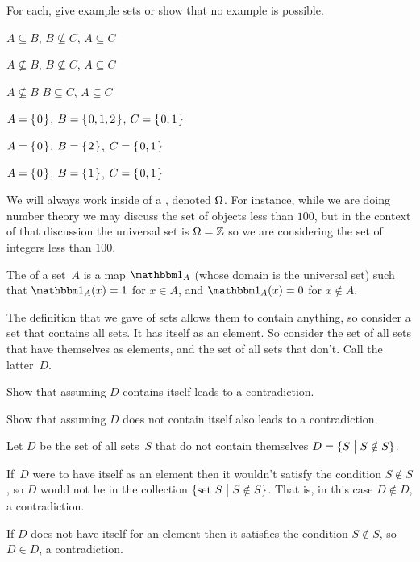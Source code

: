 \documentclass{ibl}  %
\begin{document}
\begin{ex} For each, give example sets or show that no example is possible.
\begin{items}
\item $A\subseteq B$, $B\not\subseteq C$, $A\subseteq C$
\item $A\not\subseteq B$, $B\not\subseteq C$, $A\subseteq C$
\item $A\not\subseteq B$ $B\subseteq C$, $A\subseteq C$    
\end{items}
\begin{ans}
\begin{items}
\item $A=\mbox{$\{\hspace{0.1em}0\hspace{0.1em}\}$}$, $B=\mbox{$\{\hspace{0.1em}0,1,2\hspace{0.1em}\}$}$, $C=\mbox{$\{\hspace{0.1em}0,1\hspace{0.1em}\}$}$
\item $A=\mbox{$\{\hspace{0.1em}0\hspace{0.1em}\}$}$, $B=\mbox{$\{\hspace{0.1em}2\hspace{0.1em}\}$}$, $C=\mbox{$\{\hspace{0.1em}0,1\hspace{0.1em}\}$}$
\item $A=\mbox{$\{\hspace{0.1em}0\hspace{0.1em}\}$}$, $B=\mbox{$\{\hspace{0.1em}1\hspace{0.1em}\}$}$, $C=\mbox{$\{\hspace{0.1em}0,1\hspace{0.1em}\}$}$
\end{items}
\end{ans}
\end{ex}

We will always work inside of a , 
denoted $\Omega$.
For instance, while we are doing number theory we may discuss 
the set of objects less than $100$,
but in the context of that discussion the universal set is $\Omega=\mathbb{Z}$ 
so we are considering the set of integers less than $100$.

\begin{df}
The  of a set~$A$ is a map
$\charfcn{A}$ (whose domain is the universal set) such that
$\charfcn{A}(x)=1$ for $x\in A$, and $\charfcn{A}(x)=0$ for $x\notin A$.  
\end{df}

\begin{ex} 
The definition that we gave of sets allows them to contain anything, so 
consider a set that contains all sets.
It has itself as an element.
So consider the set of all sets that have themselves as elements, and  
the set of all sets that don't.
Call the latter~$D$.
\begin{exes}
\item Show that assuming $D$ contains itself leads to a contradiction.
\item Show that assuming $D$ does not contain itself also leads to a
contradiction.  
\end{exes}
\begin{ans}
Let $D$ be the set of all sets~$S$ that do not contain themselves
$D=\{S \bigm| S\notin S\}$.
\begin{exes}
\item If~$D$ were to have itself as an element 
  then it wouldn't satisfy the condition
  $S\notin S$, so $D$ would not be in the collection 
  $\{\text{set~$S$} \bigm| S\notin S\}$.
  That is, in this case $D\notin D$, a contradiction. 
\item If $D$ does not have itself for an element then it satisfies the
  condition $S\notin S$, so $D\in D$, a contradiction.
\end{exes}
\end{ans}
\end{ex}
\end{document}
